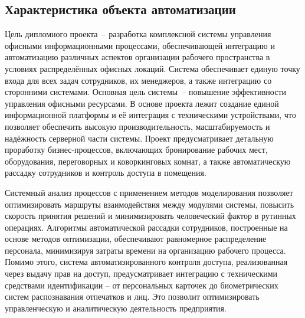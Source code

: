 \subsection{Характеристика объекта автоматизации}

Цель дипломного проекта~-- разработка комплексной системы управления офисными информационными процессами, обеспечивающей интеграцию и автоматизацию различных аспектов организации рабочего пространства в условиях распределённых офисных локаций. Система обеспечивает единую точку входа для всех задач сотрудников, их менеджеров, а также интеграцию со сторонними системами. Основная цель системы~-- повышение эффективности управления офисными ресурсами. В основе проекта лежит создание единой информационной платформы и её интеграция с техническими устройствами, что позволяет обеспечить высокую производительность, масштабируемость и надёжность серверной части системы. Проект предусматривает детальную проработку бизнес-процессов, включающих бронирование рабочих мест, оборудования, переговорных и коворкинговых комнат, а также автоматическую рассадку сотрудников и контроль доступа в помещения.

Системный анализ процессов с применением методов моделирования позволяет оптимизировать маршруты взаимодействия между модулями системы, повысить скорость принятия решений и минимизировать человеческий фактор в рутинных операциях. Алгоритмы автоматической рассадки сотрудников, построенные на основе методов оптимизации, обеспечивают равномерное распределение персонала, минимизируя затраты времени на организацию рабочего процесса. Помимо этого, система автоматизированного контроля доступа, реализованная через выдачу прав на доступ, предусматривает интеграцию с техническими средствами идентификации – от персональных карточек до биометрических систем распознавания отпечатков и лиц. Это позволит оптимизировать управленческую и аналитическую деятельность предприятия.
